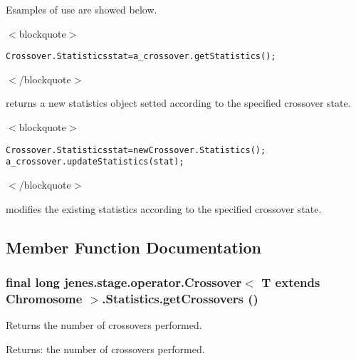 Esamples of use are showed below. 

$<$blockquote$>$\small\begin{alltt}
 Crossover.Statistics stat = a\_crossover.getStatistics();
 \end{alltt}
\normalsize 
$<$/blockquote$>$ 

returns a new statistics object setted according to the specified crossover state. 

$<$blockquote$>$\small\begin{alltt}
 Crossover.Statistics stat = new Crossover.Statistics();
 a\_crossover.updateStatistics(stat);
 \end{alltt}
\normalsize 
$<$/blockquote$>$ 

modifies the existing statistics according to the specified crossover state. 

\subsection{Member Function Documentation}
\hypertarget{classjenes_1_1stage_1_1operator_1_1_crossover_3_01_t_01extends_01_chromosome_01_4_1_1_statistics_6181ee46b3e760f5d440e758d95db04b}{
\subsubsection[getCrossovers]{\setlength{\rightskip}{0pt plus 5cm}final long jenes.stage.operator.Crossover$<$ T extends Chromosome $>$.Statistics.getCrossovers ()}}
\label{classjenes_1_1stage_1_1operator_1_1_crossover_3_01_t_01extends_01_chromosome_01_4_1_1_statistics_6181ee46b3e760f5d440e758d95db04b}


Returns the number of crossovers performed.

\begin{Desc}
\item[Returns:]the number of crossovers performed. \end{Desc}


